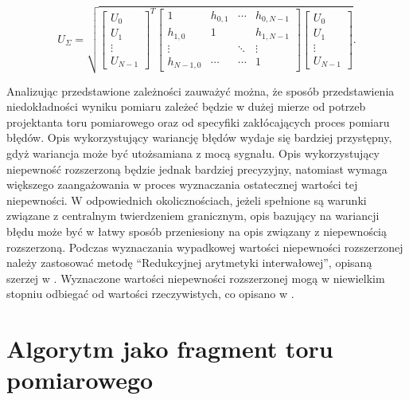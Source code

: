 \begin{equation}
U_{\Sigma} = \sqrt{
\begin{bmatrix}
U_{0} \\ U_{1} \\ \vdots \\ U_{N-1}
\end{bmatrix}^{T}
\begin{bmatrix}
1         & h_{0,1} & \cdots & h_{0,N-1} \\
h_{1,0}   & 1       &        & h_{1,N-1} \\
\vdots    &         & \ddots & \vdots    \\
h_{N-1,0} & \cdots  & \cdots & 1
\end{bmatrix}
\begin{bmatrix}
U_{0} \\ U_{1} \\ \vdots \\ U_{N-1}
\end{bmatrix}}
\label{eqn_unc_matrix}.
\end{equation}

Analizując przedstawione zależności zauważyć można, że sposób przedstawienia niedokładności wyniku pomiaru zależeć będzie w dużej mierze od potrzeb projektanta toru pomiarowego oraz od specyfiki zakłócających proces pomiaru błędów. Opis wykorzystujący wariancję błędów wydaje się bardziej przystępny, gdyż wariancja może być utożsamiana z mocą sygnału. Opis wykorzystujący niepewność rozszerzoną będzie jednak bardziej precyzyjny, natomiast wymaga większego zaangażowania w proces wyznaczania ostatecznej wartości tej niepewności. W odpowiednich okolicznościach, jeżeli spełnione są warunki związane z centralnym twierdzeniem granicznym, opis bazujący na wariancji błędu może być w łatwy sposób przeniesiony na opis związany z niepewnością rozszerzoną. Podczas wyznaczania wypadkowej wartości niepewności rozszerzonej należy zastosować metodę \enquote{Redukcyjnej arytmetyki interwałowej}, opisaną szerzej w \cite{jakubiec_reductive, jakubiec_arithmetic, batko_uncertainty}. Wyznaczone wartości niepewności rozszerzonej mogą w niewielkim stopniu odbiegać od wartości rzeczywistych, co opisano w \cite{jakubiec_arithmetic, jakubiec_model}.

\section{Algorytm jako fragment toru pomiarowego}

